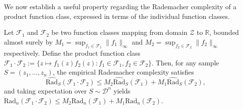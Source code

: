 We now establish a useful property regarding the Rademacher complexity of a product function class, expressed in terms of the individual function classes.
\begin{lemma}\label{lem:product_rademacher}
Let $\mathcal{F}_1$ and $\mathcal{F}_2$ be two function classes mapping from domain $\mathcal{Z}$ to $\mathbb{R}$, bounded almost surely by $M_1 = \sup_{f_1 \in \mathcal{F}_1} \|f_1\|_\infty$ and $M_2 = \sup_{f_2 \in \mathcal{F}_2} \|f_2\|_\infty$ respectively. Define the product function class $\mathcal{F}_1 \cdot \mathcal{F}_2 := \{ z \mapsto f_1(z) f_2(z) : f_1 \in \mathcal{F}_1, f_2 \in \mathcal{F}_2 \}$. Then, for any sample $S = (z_1, \dots, z_n)$, the empirical Rademacher complexity satisfies
\begin{equation*}
    \widehat{\mathrm{Rad}}_S(\mathcal{F}_1 \cdot \mathcal{F}_2) \le M_2 \widehat{\mathrm{Rad}}_S(\mathcal{F}_1) + M_1 \widehat{\mathrm{Rad}}_S(\mathcal{F}_2),
\end{equation*}
and taking expectation over $S \sim \mathcal{D}^n$ yields $\mathrm{Rad}_n(\mathcal{F}_1 \cdot \mathcal{F}_2) \le M_2 \mathrm{Rad}_n(\mathcal{F}_1) + M_1 \mathrm{Rad}_n(\mathcal{F}_2)$.
\end{lemma}
